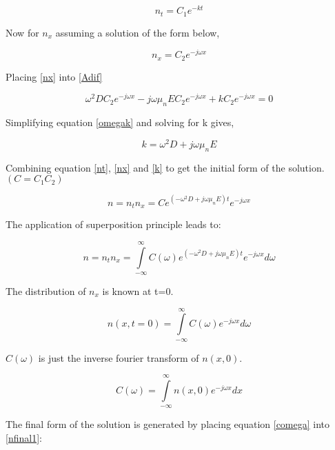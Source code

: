 \begin{equation}
n_t=C_1 e^{-kt}
\label{nt}
\end{equation}

Now for $n_x$ assuming a solution of the form below,

\begin{equation}
n_x=C_2 e^{-j\omega x}
\label{nx}
\end{equation}

Placing \eqref{nx} into \eqref{Adif}

\begin{equation}
\omega^2 D C_2 e^{-j\omega x}-j\omega \mu_n E C_2 e^{-j\omega x}+kC_2e^{-j\omega x}=0
\label{omegak}
\end{equation}

Simplifying equation \eqref{omegak} and solving for k gives,

\begin{equation}
k=\omega^2 D+j\omega \mu_n E
\label{k}
\end{equation}

Combining equation \eqref{nt}, \eqref{nx} and \eqref{k} to get the initial form of the solution. $(C=C_1C_2)$

\begin{equation}
n=n_tn_x=Ce^{(-\omega^2 D + j\omega \mu_n E)t} e^{-j\omega x}
\end{equation}

The application of superposition principle leads to:

\begin{equation}
n=n_tn_x=\int\limits_{-\infty}^{\infty}C(\omega)e^{(-\omega^2 D + j\omega \mu_n E)t} e^{-j\omega x}d\omega
\label{nfinal1}
\end{equation}

The distribution of $n_x$ is known at t=0.

\begin{equation}
n(x,t=0)=\int\limits_{-\infty}^{\infty}C(\omega) e^{-j\omega x}d\omega
\end{equation}

$C(\omega)$ is just the inverse fourier transform of $n(x,0)$.

\begin{equation}
C(\omega)=\int\limits_{-\infty}^{\infty}n(x,0)e^{-j\omega x}dx
\label{comega}
\end{equation}

The final form of the solution is generated by placing equation \eqref{comega} into \eqref{nfinal1}:

